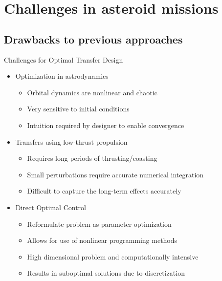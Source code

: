 
\section[Challenges]{Challenges in asteroid missions}
\subsection[Previous Approaches]{Drawbacks to previous approaches}

\begin{frame}{Challenges for Optimal Transfer Design} %

\begin{itemize}
    \item Optimization in astrodynamics
        \begin{itemize}
            \item Orbital dynamics are nonlinear and chaotic
            \item Very sensitive to initial conditions
            \item Intuition required by designer to enable convergence
        \end{itemize}
    \pause
    \item Transfers using low-thrust propulsion
        \begin{itemize}
            \item Requires long periods of thrusting/coasting
            \item Small perturbations require accurate numerical integration
            \item Difficult to capture the long-term effects accurately
        \end{itemize}
    \pause
    \item Direct Optimal Control
        \begin{itemize}
            \item Reformulate problem as parameter optimization
            \item Allows for use of nonlinear programming methods
            \item High dimensional problem and computationally intensive
            \item Results in suboptimal solutions due to discretization
        \end{itemize}
\end{itemize}
\end{frame}   %

